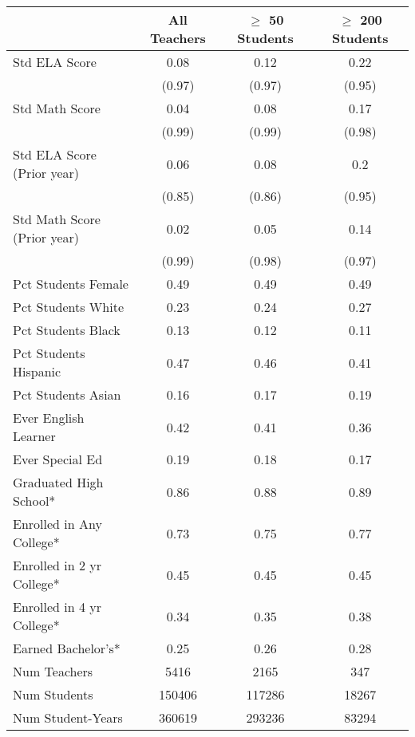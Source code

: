 \renewcommand{\arraystretch}{1.2}

\begin{tabular}{lccc}
    \hline
    \hline
     & All Teachers & $\geq$ 50 Students & $\geq$ 200 Students \\
    \hline
    \hline 
    Std ELA Score & 0.08 & 0.12 & 0.22 \\
     & (0.97) & (0.97) & (0.95) \\
    Std Math Score & 0.04 & 0.08 & 0.17 \\
     & (0.99) & (0.99) & (0.98) \\
    Std ELA Score (Prior year) & 0.06 & 0.08 & 0.2 \\
     & (0.85) & (0.86) & (0.95) \\
    Std Math Score (Prior year) & 0.02 & 0.05 & 0.14 \\
     & (0.99) & (0.98) & (0.97) \\
    Pct Students Female & 0.49 & 0.49 & 0.49 \\
    Pct Students White & 0.23 & 0.24 & 0.27 \\
    Pct Students Black & 0.13 & 0.12 & 0.11 \\
    Pct Students Hispanic & 0.47 & 0.46 & 0.41 \\
    Pct Students Asian & 0.16 & 0.17 & 0.19 \\
    Ever English Learner & 0.42 & 0.41 & 0.36 \\
    Ever Special Ed & 0.19 & 0.18 & 0.17 \\
    Graduated High School* & 0.86 & 0.88 & 0.89 \\
    Enrolled in Any College* & 0.73 & 0.75 & 0.77 \\
    Enrolled in 2 yr College* & 0.45 & 0.45 & 0.45 \\
    Enrolled in 4 yr College* & 0.34 & 0.35 & 0.38 \\
    Earned Bachelor's* & 0.25 & 0.26 & 0.28 \\
    Num Teachers & 5416 & 2165 & 347 \\
    Num Students & 150406 & 117286 & 18267 \\
    Num Student-Years & 360619 & 293236 & 83294 \\
    \hline
    \hline
\end{tabular}
